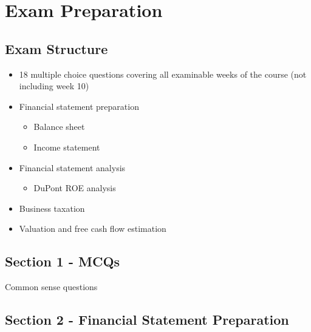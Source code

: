 \documentclass{article}
\begin{document}
\newpage

\section{Exam Preparation}

	\subsection{Exam Structure}
		
		\begin{itemize}
			\item 18 multiple choice questions covering all examinable weeks of the course (not including week 10)
			\item Financial statement preparation
				\begin{itemize}
					\item Balance sheet
					\item Income statement
				\end{itemize}
			\item Financial statement analysis
				\begin{itemize}
					\item DuPont ROE analysis
				\end{itemize}
			\item Business taxation
			\item Valuation and free cash flow estimation
		\end{itemize}
		
	\subsection{Section 1 - MCQs}

		Common sense questions
	
	\subsection{Section 2 - Financial Statement Preparation}
\end{document}
